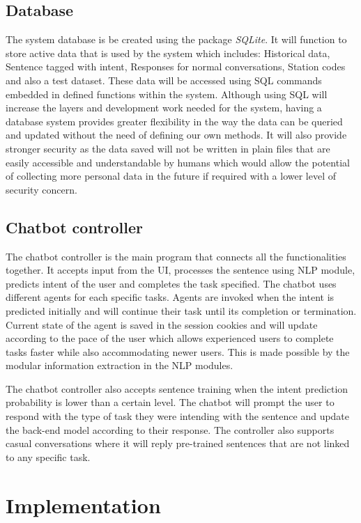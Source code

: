 \documentclass[11pt]{article}
\begin{document}
\subsection{Database}
The system database is be created using the package \textit{SQLite}. It will function to store active data that is used by the system which includes: Historical data, Sentence tagged with intent, Responses for normal conversations, Station codes and also a test dataset. These data will be accessed using SQL commands embedded in defined functions within the system. Although using SQL will increase the layers and development work needed for the system, having a database system provides greater flexibility in the way the data can be queried and updated without the need of defining our own methods. It will also provide stronger security as the data saved will not be written in plain files that are easily accessible and understandable by humans which would allow the potential of collecting more personal data in the future if required with a lower level of security concern.

\subsection{Chatbot controller} 
The chatbot controller is the main program that connects all the functionalities together. It accepts input from the UI, processes the sentence using NLP module, predicts intent of the user and completes the task specified. The chatbot uses different agents for each specific tasks. Agents are invoked when the intent is predicted initially and will continue their task until its completion or termination. Current state of the agent is saved in the session cookies and will update according to the pace of the user which allows experienced users to complete tasks faster while also accommodating newer users. This is made possible by the modular information extraction in the NLP modules.

The chatbot controller also accepts sentence training when the intent prediction probability is lower than a certain level. The chatbot will prompt the user to respond with the type of task they were intending with the sentence and update the back-end model according to their response. The controller also supports casual conversations where it will reply pre-trained sentences that are not linked to any specific task.

\section{Implementation}
\end{document}
